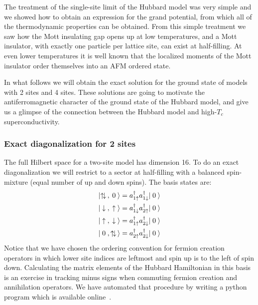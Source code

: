 The treatment of the single-site limit of the Hubbard model was very simple and
we showed how to obtain an expression for the grand potential, from which all of
the thermodynamic properties can be obtained.  From this simple treatment we
saw how the Mott insulating gap opens up at low temperatures, and a Mott
insulator, with exactly one particle per lattice site, can exist at
half-filling.   At even lower temperatures it is well known that the localized
moments of the Mott insulator order themselves into an AFM ordered state. 

In what follows we will obtain the exact solution for the ground state of
models with 2 sites and 4 sites.  These solutions are going to motivate the
antiferromagnetic character of the ground state of the Hubbard model, and give
us a glimpse of the connection between the Hubbard model and high-$T_{c}$
superconductivity. 

\subsubsection { Exact diagonalization for 2 sites } 

The full Hilbert space for a two-site model has dimension 16.  To do an exact
diagonalization we will restrict to a sector at half-filling with a balanced
spin-mixture (equal number of up and down spins).  The basis states are:
\begin{align}
  |\ndbl, \nvac \rangle  & =  
      a_{1\spup}^{\dagger} a_{1\spdn}^{\dagger} |\nvac\rangle \\  
  |\nspdn, \nspup \rangle & =    
      a_{1\spdn}^{\dagger} a_{2\spup}^{\dagger} |\nvac\rangle \\  
  |\nspup, \nspdn \rangle & =   
      a_{1\spup}^{\dagger} a_{2\spdn}^{\dagger} |\nvac\rangle \\  
  | \nvac, \ndbl \rangle & =  
      a_{2\spup}^{\dagger} a_{2\spdn}^{\dagger} |\nvac\rangle \\  
\end{align}
Notice that we have chosen the ordering convention for fermion creation
operators in which lower site indices are leftmost and spin up is to the left
of spin down.   Calculating the matrix elements of the Hubbard Hamiltonian in
this basis is an exercise in tracking minus signs when commuting fermion
creation and annihilation operators.   We have automated that procedure by
writing a python program which is available online~\cite{PedroMDuarte:11558}.

